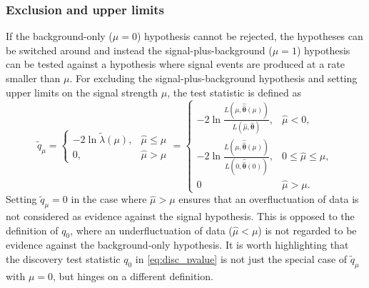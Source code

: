 \subsubsection{Exclusion and upper limits}
If the background-only ($\mu = 0$) hypothesis cannot be rejected, the hypotheses can be switched around and instead the signal-plus-background ($\mu = 1$) hypothesis can be tested against a hypothesis where signal events are produced at a rate smaller than $\mu$. For excluding the signal-plus-background hypothesis and setting upper limits on the signal strength $\mu$, the test statistic is defined as
\begin{equation}
	\tilde{q}_\mu = 
\begin{cases}
    -2\ln{\tilde{\lambda}(\mu)}, & \hat{\mu} \leq \mu				\\
    0,              & \hat{\mu} > \mu
\end{cases} =
\begin{cases}
    -2 \ln{\frac{L(\mu,\boldsymbol{\hat{\hat{\theta}}}(\mu))}{L(\hat{\mu},\hat{\boldsymbol{\theta}})}}, & \hat{\mu} < 0,\\
    -2 \ln{\frac{L(\mu,\boldsymbol{\hat{\hat{\theta}}}(\mu))}{L(0,\boldsymbol{\hat{\hat{\theta}}}(0))}},              & 0 \leq \hat{\mu} \leq \mu, \\
    0  & \hat{\mu} > \mu.
\end{cases}
\label{eq:upper_limit_test_statistic}
\end{equation}
Setting $\tilde{q}_\mu = 0$ in the case where $\hat{\mu} > \mu$ ensures that an overfluctuation of data is not considered as evidence against the signal hypothesis. This is opposed to the definition of $q_0$, where an underfluctuation of data ($\hat{\mu} < \mu$) is not regarded to be evidence against the background-only hypothesis.
It is worth highlighting that the discovery test statistic $q_0$ in \cref{eq:disc_pvalue} is not just the special case of $\tilde{q}_\mu$ with $\mu=0$, but hinges on a different definition.
 
